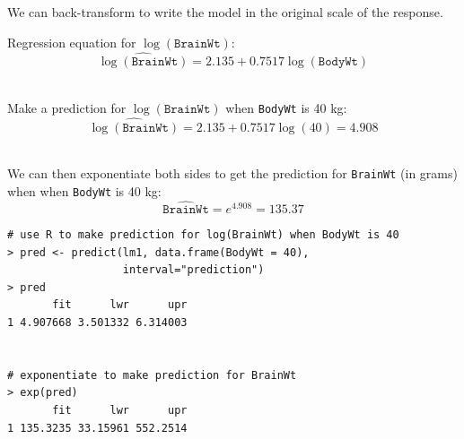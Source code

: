 \documentclass[10pt]{beamer}
\begin{document}
\begin{frame}
\vspace{-3.5cm}
 We can back-transform to write the model in the original scale of the response.  
% 
\end{frame}

\begin{frame}
Regression equation for $\log(\texttt{BrainWt})$:
$$\widehat{\log(\texttt{BrainWt})}= 2.135 + 0.7517 \log(\texttt{BodyWt})$$\\
\vspace{5pt}

Make a prediction for $\log(\texttt{BrainWt})$ when \texttt{BodyWt} is 40 kg:
$$\widehat{\log(\texttt{BrainWt})} = 2.135 + 0.7517 \log(40) = 4.908$$\\
\vspace{5pt}

We can then exponentiate both sides to get the prediction for \texttt{BrainWt} (in grams) when when \texttt{BodyWt} is 40 kg:\\
$$\widehat{\texttt{BrainWt}} = e^{4.908} = 135.37$$
\end{frame}

\begin{frame}[fragile]
\begin{verbatim}
# use R to make prediction for log(BrainWt) when BodyWt is 40
> pred <- predict(lm1, data.frame(BodyWt = 40), 
                  interval="prediction")
> pred
       fit      lwr      upr
1 4.907668 3.501332 6.314003


# exponentiate to make prediction for BrainWt
> exp(pred)
       fit      lwr      upr
1 135.3235 33.15961 552.2514
\end{verbatim}
\end{frame}
\end{document}
